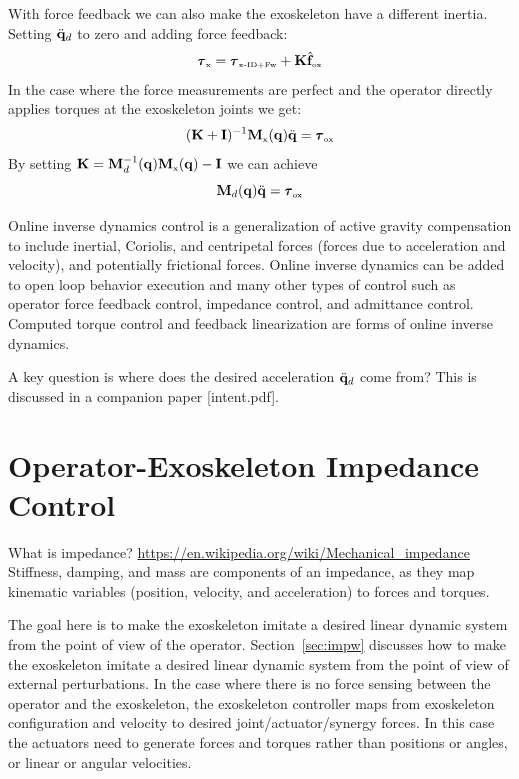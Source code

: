 \documentclass[letterpaper,12pt,fullpage]{article}
\newcommand{\myx}{{\mbox {\tiny x}}}
\newcommand{\ox}{{\mbox {\tiny ox}}}
\newcommand{\xinvdynw}{{\mbox {\tiny x-ID+Fw}}}
\begin{document}
With force feedback we can also make the exoskeleton have a different inertia.
Setting $\ddot{{\bf q}}_d$ to zero and adding force feedback:
\begin{equation}
\vtau_{\myx} = \vtau_{\xinvdynw} + \mK \hat{\vf}_{\ox}
\end{equation}
In the case where the force measurements are perfect and 
the operator directly applies torques at the
exoskeleton joints we get:
\begin{equation}
(\mK + \mI)^{-1} \mM_{\myx} (\vq) \ddot{\vq} = \vtau_{\ox}
\end{equation}
By setting $\mK = \mM^{-1}_d (\vq) \mM_{\myx} (\vq) - \mI$ we can achieve
\begin{equation}
\mM_d (\vq) \ddot{\vq} = \vtau_{\ox}
\end{equation}

Online inverse dynamics control is a generalization of 
active gravity compensation to include
inertial, Coriolis, and centripetal forces (forces due to acceleration and
velocity), and potentially frictional forces.
Online inverse dynamics can be added to open loop behavior execution
and many other types of control such as operator force
feedback control, impedance control, and admittance control.
Computed torque control and feedback linearization are forms of online
inverse dynamics.

A key question is where does the desired acceleration $\ddot{{\bf q}}_d$ come from?
This is discussed in a companion paper [intent.pdf].

\section{Operator-Exoskeleton Impedance Control}

What is impedance?
\url{https://en.wikipedia.org/wiki/Mechanical_impedance}
Stiffness, damping, and mass are components of an impedance, as
they map kinematic variables (position, velocity, and acceleration)
to forces and torques.

The goal here is to make the exoskeleton imitate a desired linear dynamic system
from the point of view of the operator.
Section~\ref{sec:impw} discusses how to make the exoskeleton 
imitate a desired linear dynamic system 
from the point of view of external perturbations.
In the case where there is no force sensing between the operator and the
exoskeleton, the exoskeleton controller maps from exoskeleton configuration
and velocity to desired joint/actuator/synergy forces.
In this case the actuators need to generate forces and torques rather than
positions or angles, or linear or angular velocities.
\end{document}
